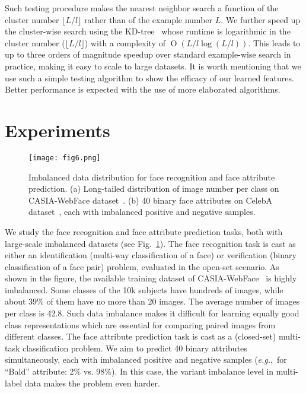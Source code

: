 \documentclass[10pt,journal,compsoc]{IEEEtran}
\newcommand{\eg}{\emph{e.g.}}
\DeclareMathOperator{\BigO}{O}
\begin{document}
Such testing procedure makes the nearest neighbor search a function of the cluster number $\lfloor L/l \rfloor$ rather than of the example number $L$. We further speed up the cluster-wise search using the KD-tree~\cite{Silpa08} whose runtime is logarithmic in the cluster number ($\lfloor L/l \rfloor$) with a complexity of $\BigO(L/l\log(L/l))$. This leads to up to three orders of magnitude speedup over standard example-wise search in practice, making it easy to scale to large datasets. It is worth mentioning that we use such a simple testing algorithm to show the efficacy of our learned features. Better performance is expected with the use of more elaborated algorithms.

\section{Experiments}
\label{sec:result}

\begin{figure}[t]
\begin{center}
\texttt{[image: fig6.png]}
\end{center}
\vspace{-1.5em}
\caption{Imbalanced data distribution for face recognition and face attribute prediction. (a) Long-tailed distribution of image number per class on CASIA-WebFace dataset~\cite{YiLLL14a}. (b) 40 binary face attributes on CelebA dataset~\cite{liu15}, each with imbalanced positive and negative samples.}
\label{fig6}
\end{figure}

We study the face recognition and face attribute prediction tasks, both with large-scale imbalanced datasets (see Fig.~\ref{fig6}). The face recognition task is cast as either an identification (multi-way classification of a face) or verification (binary classification of a face pair) problem, evaluated in the open-set scenario. As shown in the figure, the available training dataset of CASIA-WebFace~\cite{YiLLL14a} is highly imbalanced. Some classes of the 10k subjects have hundreds of images, while about 39\% of them have no more than 20 images. The average number of images per class is 42.8. Such data imbalance makes it difficult for learning equally good class representations which are essential for comparing paired images from different classes. The face attribute prediction task is cast as a (closed-set) multi-task classification problem. We aim to predict 40 binary attributes simultaneously, each with imbalanced positive and negative samples (\eg,~for ``Bald'' attribute: 2\% vs. 98\%). In this case, the variant imbalance level in multi-label data makes the problem even harder.
\end{document}
